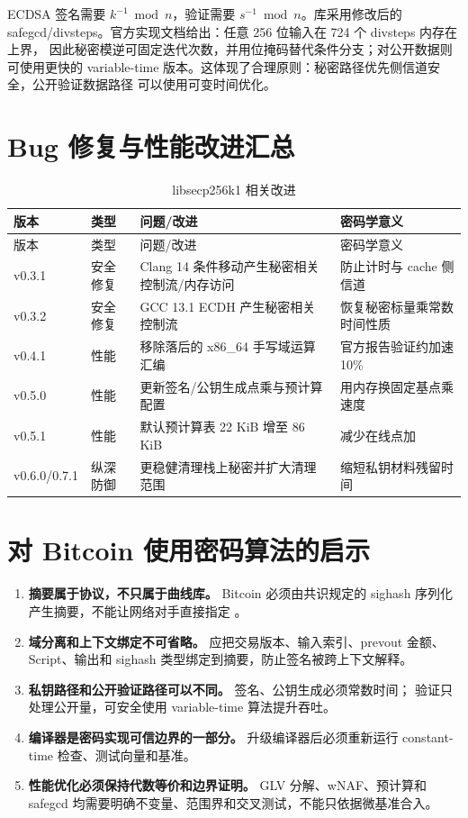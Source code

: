 \documentclass[UTF8,a4paper,12pt]{ctexart}
\newcommand{\code}[1]{\texttt{\detokenize{#1}}}
\begin{document}
ECDSA 签名需要 $k^{-1}\bmod n$，验证需要 $s^{-1}\bmod n$。库采用修改后的
safegcd/divsteps。官方实现文档给出：任意 256 位输入在 724 个 divsteps 内存在上界，
因此秘密模逆可固定迭代次数，并用位掩码替代条件分支；对公开数据则可使用更快的
variable-time 版本。这体现了合理原则：秘密路径优先侧信道安全，公开验证数据路径
可以使用可变时间优化。

\section{Bug 修复与性能改进汇总}

\begin{longtable}{p{2cm}p{3.2cm}p{4.2cm}p{4.2cm}}
  \caption{libsecp256k1 相关改进}\label{tab:changes}\\
  \toprule
  版本 & 类型 & 问题/改进 & 密码学意义 \\
  \midrule
  \endfirsthead
  \toprule 版本 & 类型 & 问题/改进 & 密码学意义 \\
  \midrule
  \endhead
  v0.3.1 & 安全修复 & Clang 14 条件移动产生秘密相关控制流/内存访问 & 防止计时与 cache 侧信道 \\
  v0.3.2 & 安全修复 & GCC 13.1 ECDH 产生秘密相关控制流 & 恢复秘密标量乘常数时间性质 \\
  v0.4.1 & 性能 & 移除落后的 x86\_64 手写域运算汇编 & 官方报告验证约加速 10\% \\
  v0.5.0 & 性能 & 更新签名/公钥生成点乘与预计算配置 & 用内存换固定基点乘速度 \\
  v0.5.1 & 性能 & 默认预计算表 22 KiB 增至 86 KiB & 减少在线点加 \\
  v0.6.0/0.7.1 & 纵深防御 & 更稳健清理栈上秘密并扩大清理范围 & 缩短私钥材料残留时间 \\
  \bottomrule
\end{longtable}

\section{对 Bitcoin 使用密码算法的启示}

\begin{enumerate}
  \item \textbf{摘要属于协议，不只属于曲线库。} Bitcoin 必须由共识规定的 sighash
  序列化产生摘要，不能让网络对手直接指定 \code{msghash32}。
  \item \textbf{域分离和上下文绑定不可省略。} 应把交易版本、输入索引、prevout
  金额、Script、输出和 sighash 类型绑定到摘要，防止签名被跨上下文解释。
  \item \textbf{私钥路径和公开验证路径可以不同。} 签名、公钥生成必须常数时间；
  验证只处理公开量，可安全使用 variable-time 算法提升吞吐。
  \item \textbf{编译器是密码实现可信边界的一部分。} 升级编译器后必须重新运行
  constant-time 检查、测试向量和基准。
  \item \textbf{性能优化必须保持代数等价和边界证明。} GLV 分解、wNAF、预计算和
  safegcd 均需要明确不变量、范围界和交叉测试，不能只依据微基准合入。
\end{enumerate}
\end{document}
